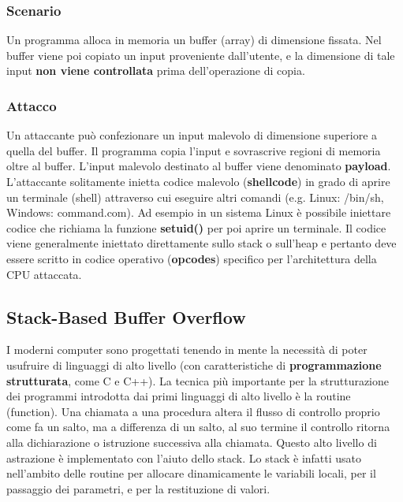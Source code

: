 \subsubsection{Scenario}
Un programma alloca in memoria un buffer (array) di dimensione fissata. Nel buffer viene poi copiato un input proveniente dall'utente, e la dimensione di tale input \textbf{non viene controllata} prima dell'operazione di copia.

\subsubsection{Attacco}
Un attaccante può confezionare un input malevolo di dimensione superiore a quella del buffer. Il programma copia l'input e sovrascrive regioni di memoria oltre al buffer. L'input malevolo destinato al buffer viene denominato \textbf{payload}. L'attaccante solitamente inietta codice malevolo (\textbf{shellcode}) in grado di aprire un terminale (shell) attraverso cui eseguire altri comandi (e.g. Linux: /bin/sh, Windows: command.com). Ad esempio in un sistema Linux è possibile iniettare codice che richiama la funzione \textbf{setuid()} per poi aprire un terminale. Il codice viene generalmente iniettato direttamente sullo stack o sull'heap e pertanto deve essere scritto in codice operativo (\textbf{opcodes}) specifico per l'architettura della CPU attaccata.

\subsection{Stack-Based Buffer Overflow}
I moderni computer sono progettati tenendo in mente la necessità di poter usufruire di linguaggi di alto livello (con caratteristiche di \textbf{programmazione strutturata}, come C e C++). La tecnica più importante per la strutturazione dei programmi introdotta dai primi linguaggi di alto livello è la routine (function). Una chiamata a una procedura altera il flusso di controllo proprio come fa un salto, ma a differenza di un salto, al suo termine il controllo ritorna alla dichiarazione o istruzione successiva alla chiamata. Questo alto livello di astrazione è implementato con l'aiuto dello stack. Lo stack è infatti usato nell'ambito delle routine per allocare dinamicamente le variabili locali, per il passaggio dei parametri, e per la restituzione di valori. \newline

